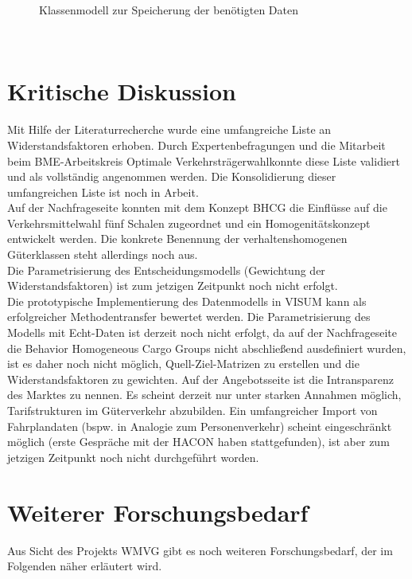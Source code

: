 \begin{figure}[htbp]
  \centering
  \caption{ Klassenmodell zur Speicherung der benötigten Daten}
  \label{_Ref364980116}
\end{figure}
~\\


% 
\section{Kritische Diskussion}
\label{_Toc366766121}
\label{_Toc366775315}
Mit Hilfe der Literaturrecherche wurde eine umfangreiche Liste an Widerstandsfaktoren erhoben. Durch Expertenbefragungen und die Mitarbeit beim BME-Arbeitskreis \glqq Optimale Verkehrsträgerwahl\grqq  konnte diese Liste validiert und als vollständig angenommen werden. Die Konsolidierung dieser umfangreichen Liste ist noch in Arbeit.~\\
Auf der Nachfrageseite konnten mit dem Konzept BHCG die Einflüsse auf die Verkehrsmittelwahl fünf Schalen zugeordnet und ein Homogenitätskonzept entwickelt werden. Die konkrete Benennung der verhaltenshomogenen Güterklassen steht allerdings noch aus.~\\
Die Parametrisierung des Entscheidungsmodells (Gewichtung der Widerstandsfaktoren) ist zum jetzigen Zeitpunkt noch nicht erfolgt.~\\
Die prototypische Implementierung des Datenmodells in VISUM kann als erfolgreicher Methodentransfer bewertet werden. Die Parametrisierung des Modells mit Echt-Daten ist derzeit noch nicht erfolgt, da auf der Nachfrageseite die Behavior Homogeneous Cargo Groups nicht abschließend ausdefiniert wurden, ist es daher noch nicht möglich, Quell-Ziel-Matrizen zu erstellen und die Widerstandsfaktoren zu gewichten. Auf der Angebotsseite ist die Intransparenz des Marktes zu nennen. Es scheint derzeit nur unter starken Annahmen möglich, Tarifstrukturen im Güterverkehr abzubilden. Ein umfangreicher Import von Fahrplandaten (bspw. in Analogie zum Personenverkehr) scheint eingeschränkt möglich (erste Gespräche mit der HACON haben stattgefunden), ist aber zum jetzigen Zeitpunkt noch nicht durchgeführt worden.
\label{_Toc365801612}
\label{_Toc366766122}
\label{_Ref361848213}
\label{_Toc363572052}
\label{_Toc363601749}~\\


% 
\section{Weiterer Forschungsbedarf }
\label{_Toc366775316}
Aus Sicht des Projekts WMVG gibt es noch weiteren Forschungsbedarf, der im Folgenden näher erläutert wird.~\\


